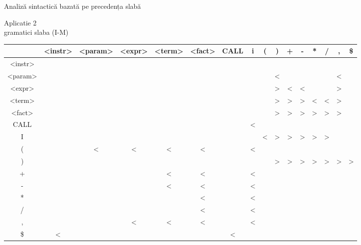 \documentclass[pdf]{beamer}
\begin{document}
\begin{frame}{Analiză sintactică bazată pe precedența slabă}
\begin{center}
Aplicatie 2\\ 
gramatici slaba (I-M)\\
\tiny
\setlength{\tabcolsep}{3pt}
\begin{table}
\begin{tabular}{| c | c | c | c | c | c | c | c | c | c | c | c | c | c | c | c |}
\hline
        &<instr>&<param>&<expr>&<term>&<fact>&CALL&i&(&)&+&-&*&/&,&\$\\
        \hline
        <instr>&&&&&&&&&&&&&&&\\
        \hline
        <param>&&&&&&&&&<&&&&&<&\\
        \hline
        <expr>&&&&&&&&&>&<&<&&&>&\\
        \hline
        <term>&&&&&&&&&>&>&>&<&<&>&\\
        \hline
        <fact>&&&&&&&&&>&>&>&>&>&>&\\
        \hline
        CALL&&&&&&&<&&&&&&&&\\
        \hline
        I&&&&&&&&<&>&>&>&>&>&&\\
        \hline
        (&&<&<&<&<&&<&&&&&&&&\\
        \hline
        )&&&&&&&&&>&>&>&>&>&>&>\\
        \hline
        +&&&&<&<&&<&&&&&&&&\\
        \hline
        -&&&&<&<&&<&&&&&&&&\\
        \hline
        *&&&&&<&&<&&&&&&&&\\
        \hline
        /&&&&&<&&<&&&&&&&&\\
        \hline
        ,&&&<&<&<&&<&&&&&&&&\\
        \hline
        \$&<&&&&&<&&&&&&&&&\\
        \hline
\end{tabular}
\end{table}
\end{center}
\end{frame}
\end{document}
